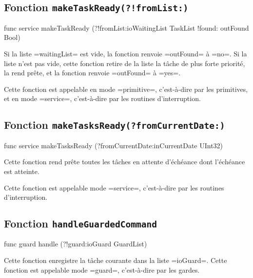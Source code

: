 \subsection{Fonction \texttt{makeTaskReady(?!fromList{}:)}}

\begin{PLM}
func service makeTaskReady (?!fromList:ioWaitingList TaskList
                            !found: outFound Bool)
\end{PLM}

Si la liste \plm=waitingList= est vide, la fonction renvoie \plm=outFound= à \plm=no=. Si la liste n'est pas vide, cette fonction retire de la liste la tâche de plus forte priorité, la rend prête, et la fonction renvoie \plm=outFound= à \plm=yes=.

Cette fonction est appelable en mode \plm=primitive=, c'est-à-dire par les primitives, et en mode \plm=service=, c'est-à-dire par les routines d'interruption.










\subsection{Fonction \texttt{makeTasksReady(?fromCurrentDate{}:)}}

\begin{PLM}
func service makeTasksReady (?fromCurrentDate:inCurrentDate UInt32)
\end{PLM}

Cette fonction rend prête toutes les tâches en attente d'échéance dont l'échéance est atteinte.

Cette fonction est appelable mode \plm=service=, c'est-à-dire par les routines d'interruption.






\subsection{Fonction \texttt{handleGuardedCommand}}

\begin{PLM}
func guard handle (?!guard:ioGuard GuardList)
\end{PLM}

Cette fonction enregistre la tâche courante dans la liste \plm=ioGuard=. Cette fonction est appelable mode \plm=guard=, c'est-à-dire par les gardes.








